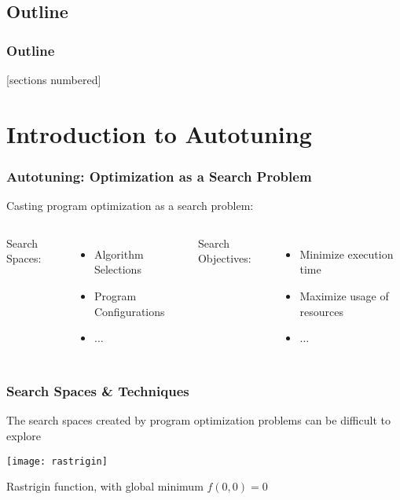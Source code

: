 \documentclass[10pt, compress, aspectratio=169, xcolor=table]{beamer}
\begin{document}
\subsection*{Outline}

\begin{frame}
    \frametitle{Outline}
    [sections numbered]
    \tableofcontents[hideallsubsections]
\end{frame}

\section{Introduction to Autotuning}

\begin{frame}
    \frametitle{Autotuning: Optimization as a Search Problem}
    Casting program optimization as a \alert{search problem}:

    \begin{columns}[T,onlytextwidth]
        \alert{Search Spaces}:
        \begin{itemize}
            \item Algorithm Selections
            \item Program Configurations
            \item $\dots$
        \end{itemize}

        \alert{Search Objectives}:
        \begin{itemize}
            \item Minimize \alert{execution time}
            \item Maximize \alert{usage of resources}
            \item $\dots$
        \end{itemize}
    \end{columns}

    \vfill
\end{frame}

\begin{frame}
    \frametitle{Search Spaces \& Techniques}
    The \alert{search spaces} created by program optimization problems can be
    \alert{difficult to explore}

    \begin{center}
        \texttt{[image: rastrigin]}

        Rastrigin function, with \alert{global minimum} $f(0,0) = 0$
    \end{center}
\end{frame}
\end{document}
